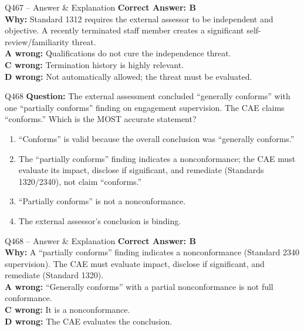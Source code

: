 \documentclass[aspectratio=169,10pt]{beamer}
\begin{document}
	\begin{frame}[t]{Q467 -- Answer \& Explanation}
		\small
		\textbf{Correct Answer: B} \\[4pt]
		\textbf{Why:} Standard 1312 requires the external assessor to be independent and objective. A recently terminated staff member creates a significant self-review/familiarity threat. \\[4pt]
		\textbf{A wrong:} Qualifications do not cure the independence threat. \\[2pt]
		\textbf{C wrong:} Termination history is highly relevant. \\[2pt]
		\textbf{D wrong:} Not automatically allowed; the threat must be evaluated.
	\end{frame}
	
	\begin{frame}[t]{Q468}
		\small
		\textbf{Question:} The external assessment concluded ``generally conforms'' with one ``partially conforms'' finding on engagement supervision. The CAE claims ``conforms.'' Which is the MOST accurate statement?
		\begin{enumerate}[label=\Alph*.,itemsep=1pt,topsep=2pt]
			\item ``Conforms'' is valid because the overall conclusion was ``generally conforms.''
			\item The ``partially conforms'' finding indicates a nonconformance; the CAE must evaluate its impact, disclose if significant, and remediate (Standards 1320/2340), not claim ``conforms.''
			\item ``Partially conforms'' is not a nonconformance.
			\item The external assessor's conclusion is binding.
		\end{enumerate}
	\end{frame}
	
	\begin{frame}[t]{Q468 -- Answer \& Explanation}
		\small
		\textbf{Correct Answer: B} \\[4pt]
		\textbf{Why:} A ``partially conforms'' finding indicates a nonconformance (Standard 2340 supervision). The CAE must evaluate impact, disclose if significant, and remediate (Standard 1320). \\[4pt]
		\textbf{A wrong:} ``Generally conforms'' with a partial nonconformance is not full conformance. \\[2pt]
		\textbf{C wrong:} It is a nonconformance. \\[2pt]
		\textbf{D wrong:} The CAE evaluates the conclusion.
	\end{frame}
	
\end{document}
